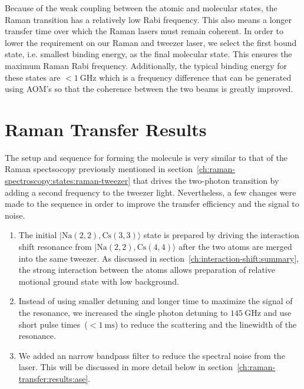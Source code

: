 Because of the weak coupling between the atomic and molecular states,
the Raman transition has a relatively low Rabi frequency.
This also means a longer transfer time over which the Raman lasers must remain coherent.
In order to lower the requirement on our Raman and tweezer laser,
we select the first bound state, i.e. smallest binding energy, as the final molecular state.
This ensures the maximum Raman Rabi frequency.
Additionally, the typical binding energy for these states are $<\!1~\mathrm{GHz}$
which is a frequency difference that can be generated using AOM's
so that the coherence between the two beams is greatly improved.

\section{Raman Transfer Results}
\label{ch:raman-transfer:results}

The setup and sequence for forming the molecule is very similar to that of the Raman spectsocopy
previously mentioned in section~\ref{ch:raman-spectroscopy:states:raman-tweezer}
that drives the two-photon transition by adding a second frequency to the tweezer light.
Nevertheless, a few changes were made to the sequence in order to improve
the transfer efficiency and the signal to noise.
\begin{enumerate}
\item The initial $|\mathrm{Na(2,2),Cs(3,3)}\rangle$ state is prepared by driving the
  interaction shift resonance from $|\mathrm{Na(2,2),Cs(4,4)}\rangle$
  after the two atoms are merged into the same tweezer.
  As discussed in section~\ref{ch:interaction-shift:summary},
  the strong interaction between the atoms allows preparation of
  relative motional ground state with low background.
\item Instead of using smaller detuning and longer time to maximize the signal of the resonance,
  we increased the single photon detuning to $145~\mathrm{GHz}$
  and use short pulse times~($<\!1~\mathrm{ms}$)
  to reduce the scattering and the linewidth of the resonance.
\item We added an narrow bandpass filter to reduce the spectral noise from the laser.
  This will be discussed in more detail below in section~\ref{ch:raman-transfer:results:ase}.
\end{enumerate}

